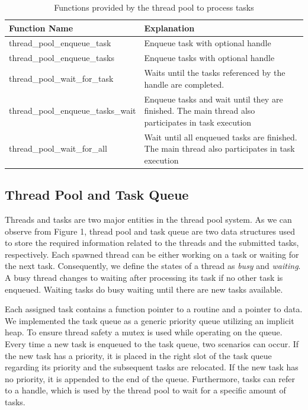\documentclass[conference]{IEEEtran}
\begin{document}
\begin{table}[htbp]
	\caption{Functions provided by the thread pool to process tasks}
	\begin{center}
		\begin{tabular}{ l l }
			\hline
			\textbf{Function Name}&\textbf{Explanation}\\
			\hline
			thread\_pool\_enqueue\_task & Enqueue task with optional handle \\
			thread\_pool\_enqueue\_tasks & Enqueue tasks with optional handle \\
			thread\_pool\_wait\_for\_task & Waits until the tasks referenced by the handle are completed. \\
			thread\_pool\_enqueue\_tasks\_wait & Enqueue tasks and wait until they are finished. The main thread also participates in task execution\\
			thread\_pool\_wait\_for\_all & Wait until all enqueued tasks are finished. The main thread also participates in task execution \\ \hline
		\end{tabular}
		\label{tab1}
	\end{center}
\end{table}

\subsection{Thread Pool and Task Queue}
Threads and tasks are two major entities in the thread pool system. As we can observe from Figure 1, thread pool and task queue are two data structures used to store the required information related to the threads and the submitted tasks, respectively. Each spawned thread can be either working on a task or waiting for the next task. Consequently, we define the states of a thread as \emph{busy} and \emph{waiting}. A busy thread changes to waiting after processing its task if no other task is enqueued. Waiting tasks do busy waiting until there are new tasks available.

Each assigned task contains a function pointer to a routine and a pointer to data. We implemented the task queue as a generic priority queue utilizing an implicit heap. To ensure thread safety a mutex is used while operating on the queue. Every time a new task is enqueued to the task queue, two scenarios can occur. If the new task has a priority, it is placed in the right slot of the task queue regarding its priority and the subsequent tasks are relocated. If the new task has no priority, it is appended to the end of the queue. Furthermore, tasks can refer to a handle, which is used by the thread pool to wait for a specific amount of tasks.
\end{document}

